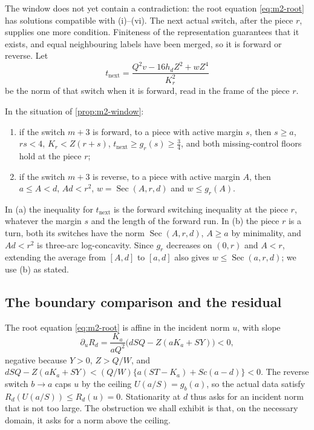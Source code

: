 The window does not yet contain a contradiction: the root equation \eqref{eq:m2-root} has solutions
compatible with (i)--(vi). The next actual switch, after the piece $r$, supplies one more condition.
Finiteness of the representation guarantees that it exists, and equal neighbouring labels have
been merged, so it is forward or reverse. Let
\[
t_{\mathrm{next}}=\frac{Q^2v-16h_dZ^2+wZ^4}{K_r^2}
\]
be the norm of that switch when it is forward, read in the frame of the piece $r$.

\begin{proposition}\label{prop:m2-continuation}
In the situation of \cref{prop:m2-window}:
\begin{enumerate}[label=(\alph*)]
\item if the switch $m+3$ is forward, to a piece with active margin $s$, then $s\ge a$, $rs<4$,
$K_r<Z(r+s)$, $t_{\mathrm{next}}\ge g_r(s)\ge\frac34$, and both missing-control floors hold at the
piece $r$;
\item if the switch $m+3$ is reverse, to a piece with active margin $A$, then $a\le A<d$, $Ad<r^2$,
$w=\operatorname{Sec}(A,r,d)$ and $w\le g_r(A)$.
\end{enumerate}
\end{proposition}

In (a) the inequality for $t_{\mathrm{next}}$ is the forward switching inequality at the piece $r$,
whatever the margin $s$ and the length of the forward run. In (b) the piece $r$ is a turn, both its
switches have the norm $\operatorname{Sec}(A,r,d)$, $A\ge a$ by minimality, and $Ad<r^2$ is
three-arc log-concavity. Since $g_r$ decreases on $(0,r)$ and $A<r$, extending the average from
$[A,d]$ to $[a,d]$ also gives $w\le\operatorname{Sec}(a,r,d)$; we use (b) as stated.

\subsection{The boundary comparison and the residual}\label{sec:m2-comparison}

The root equation \eqref{eq:m2-root} is affine in the incident norm $u$, with slope
\begin{equation}\label{eq:m2-Ru}
\partial_uR_d=\frac{K_a}{aQ^2}\bigl(dSQ-Z(aK_a+SY)\bigr)<0,
\end{equation}
negative because $Y>0$, $Z>Q/W$, and $dSQ-Z(aK_a+SY)<(Q/W)\{a(ST-K_a)+Sc(a-d)\}<0$. The reverse
switch $b\to a$ caps $u$ by the ceiling $U(a/S)=g_b(a)$, so the actual data satisfy
$R_d(U(a/S))\le R_d(u)=0$. Stationarity at $d$ thus asks for an incident norm that is not too large.
The obstruction we shall exhibit is that, on the necessary domain, it asks for a norm above the
ceiling.


